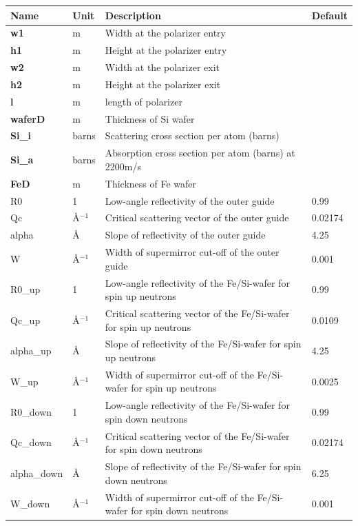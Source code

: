 \begin{longtable}{p{}p{}p{}p{}}
\toprule
\textbf{Name} & \textbf{Unit} & \textbf{Description} & \textbf{Default} \\
\midrule
\endhead
\textbf{w1} & m & Width at the polarizer entry &  \\
\textbf{h1} & m & Height at the polarizer entry &  \\
\textbf{w2} & m & Width at the polarizer exit &  \\
\textbf{h2} & m & Height at the polarizer exit &  \\
\textbf{l} & m & length of polarizer &  \\
\textbf{waferD} & m & Thickness of Si wafer &  \\
\textbf{Si\_i} & barns & Scattering cross section per atom (barns) &  \\
\textbf{Si\_a} & barns & Absorption cross section per atom (barns) at 2200m/s &  \\
\textbf{FeD} & m & Thickness of Fe wafer &  \\
R0 & 1 & Low-angle reflectivity of the outer guide & 0.99 \\
Qc & \AA{}$^{-1}$ & Critical scattering vector of the outer guide & 0.02174 \\
alpha & \AA{} & Slope of reflectivity of the outer guide & 4.25 \\
W & \AA{}$^{-1}$ & Width of supermirror cut-off of the outer guide & 0.001 \\
R0\_up & 1 & Low-angle reflectivity of the Fe/Si-wafer for spin up neutrons & 0.99 \\
Qc\_up & \AA{}$^{-1}$ & Critical scattering vector of the Fe/Si-wafer for spin up neutrons & 0.0109 \\
alpha\_up & \AA{} & Slope of reflectivity of the Fe/Si-wafer for spin up neutrons & 4.25 \\
W\_up & \AA{}$^{-1}$ & Width of supermirror cut-off of the Fe/Si-wafer for spin up neutrons & 0.0025 \\
R0\_down & 1 & Low-angle reflectivity of the Fe/Si-wafer for spin down neutrons & 0.99 \\
Qc\_down & \AA{}$^{-1}$ & Critical scattering vector of the Fe/Si-wafer for spin down neutrons & 0.02174 \\
alpha\_down & \AA{} & Slope of reflectivity of the Fe/Si-wafer for spin down neutrons & 6.25 \\
W\_down & \AA{}$^{-1}$ & Width of supermirror cut-off of the Fe/Si-wafer for spin down neutrons & 0.001 \\

\end{longtable}
